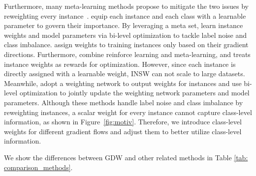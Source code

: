 %
Furthermore, many meta-learning methods propose to mitigate the two issues by reweighting every instance~\cite{renLearningReweightExamples2018,saxenaDataParametersNew2019a,shuMetaWeightNetLearningExplicit2019a,huLearningDataManipulation2019a,wangOptimizingDataUsage2020b}.
%
\cite{saxenaDataParametersNew2019a} equip each instance and each class with a learnable parameter to govern their importance.
%
By leveraging a meta set, \cite{renLearningReweightExamples2018,shuMetaWeightNetLearningExplicit2019a,huLearningDataManipulation2019a,wangOptimizingDataUsage2020b} learn instance weights and model parameters via bi-level optimization to tackle label noise and class imbalance.
%
\cite{renLearningReweightExamples2018} assign weights to training instances only based on their gradient directions.
%
Furthermore, \cite{huLearningDataManipulation2019a} combine reinforce learning and meta-learning, and treats instance weights as rewards for optimization.
%
However, since each instance is directly assigned with a learnable weight, INSW can not scale to large datasets.
%
Meanwhile, \cite{shuMetaWeightNetLearningExplicit2019a,wangOptimizingDataUsage2020b} adopt a weighting network to output weights for instances and use bi-level optimization to jointly update the weighting network parameters and model parameters.
%
Although these methods handle label noise and class imbalance by reweighting instances, a scalar weight for every instance cannot capture class-level information, as shown in Figure~\ref{fig:motiv}.
%
Therefore, we introduce class-level weights for different gradient flows and adjust them to better utilize class-level information.
%

We show the differences between GDW and other related methods in Table \ref{tab: comparison_methods}.


